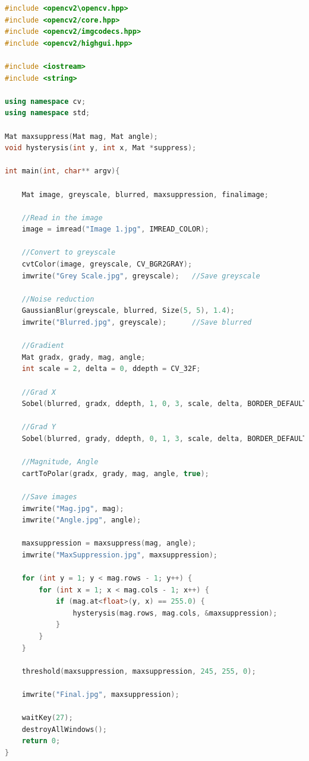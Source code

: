 \documentclass[a4paper, 10pt]{article}
\begin{document}
\begin{lstlisting}[language = C++]
#include <opencv2\opencv.hpp>
#include <opencv2/core.hpp>
#include <opencv2/imgcodecs.hpp>
#include <opencv2/highgui.hpp>

#include <iostream>
#include <string>

using namespace cv;
using namespace std;

Mat maxsuppress(Mat mag, Mat angle);
void hysterysis(int y, int x, Mat *suppress);

int main(int, char** argv){

	Mat image, greyscale, blurred, maxsuppression, finalimage;
	
	//Read in the image
	image = imread("Image 1.jpg", IMREAD_COLOR);   

	//Convert to greyscale
	cvtColor(image, greyscale, CV_BGR2GRAY);
	imwrite("Grey Scale.jpg", greyscale);	//Save greyscale

	//Noise reduction
	GaussianBlur(greyscale, blurred, Size(5, 5), 1.4);
	imwrite("Blurred.jpg", greyscale);		//Save blurred

	//Gradient
	Mat gradx, grady, mag, angle;
	int scale = 2, delta = 0, ddepth = CV_32F;

	//Grad X
	Sobel(blurred, gradx, ddepth, 1, 0, 3, scale, delta, BORDER_DEFAULT);

	//Grad Y
	Sobel(blurred, grady, ddepth, 0, 1, 3, scale, delta, BORDER_DEFAULT);

	//Magnitude, Angle
	cartToPolar(gradx, grady, mag, angle, true);

	//Save images
	imwrite("Mag.jpg", mag);
	imwrite("Angle.jpg", angle);

	maxsuppression = maxsuppress(mag, angle);
	imwrite("MaxSuppression.jpg", maxsuppression);

	for (int y = 1; y < mag.rows - 1; y++) {
		for (int x = 1; x < mag.cols - 1; x++) {
			if (mag.at<float>(y, x) == 255.0) {
				hysterysis(mag.rows, mag.cols, &maxsuppression);
			}
		}
	}

	threshold(maxsuppression, maxsuppression, 245, 255, 0);
	
	imwrite("Final.jpg", maxsuppression);

	waitKey(27);
	destroyAllWindows();
	return 0;
}


\end{lstlisting}
\end{document}
